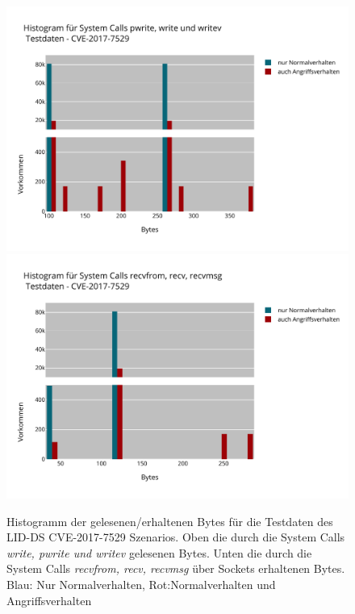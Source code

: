                 \begin{figure}
                    \includegraphics[width=\textwidth]{images/CVE-2017-7529--Test-datawritten.pdf}
                    \includegraphics[width=\textwidth]{images/CVE-2017-7529--Test-datasocket_recv.pdf}
                    \caption{Histogramm der gelesenen/erhaltenen Bytes für die Testdaten des LID-DS CVE-2017-7529 Szenarios.
                    Oben die durch die System Calls \textit{write, pwrite und writev} gelesenen Bytes.
                    Unten die durch die System Calls \textit{recvfrom, recv, recvmsg} über Sockets erhaltenen Bytes.
                    Blau: Nur Normalverhalten, Rot:Normalverhalten und Angriffsverhalten}
                    \label{fig:return_values}
                \end{figure}

